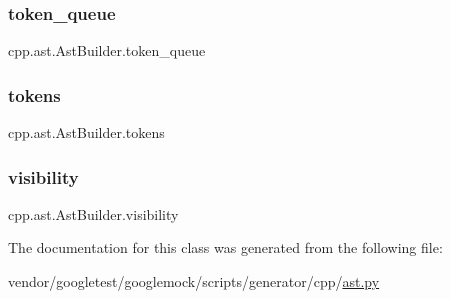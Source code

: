\subsubsection{\texorpdfstring{token\+\_\+queue}{token\_queue}}
{\footnotesize\ttfamily cpp.\+ast.\+Ast\+Builder.\+token\+\_\+queue}

\mbox{\label{classcpp_1_1ast_1_1_ast_builder_a1b21f8bef712e91862ccb6b1147cab0d}} 
\subsubsection{\texorpdfstring{tokens}{tokens}}
{\footnotesize\ttfamily cpp.\+ast.\+Ast\+Builder.\+tokens}

\mbox{\label{classcpp_1_1ast_1_1_ast_builder_a2f16b19846c405101235432d2666b614}} 
\subsubsection{\texorpdfstring{visibility}{visibility}}
{\footnotesize\ttfamily cpp.\+ast.\+Ast\+Builder.\+visibility}



The documentation for this class was generated from the following file\+:\begin{DoxyCompactItemize}
\item 
vendor/googletest/googlemock/scripts/generator/cpp/\hyperlink{ast_8py}{ast.\+py}\end{DoxyCompactItemize}
